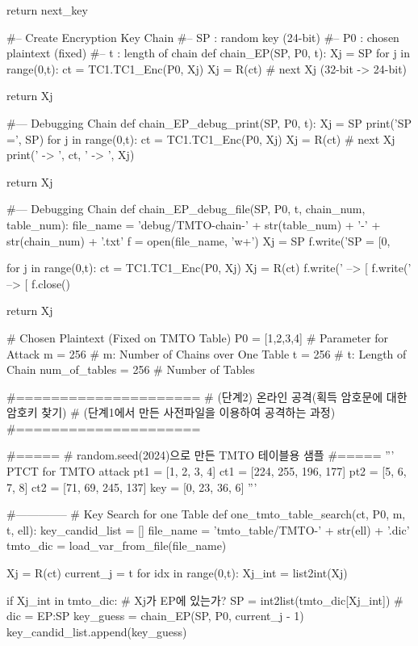 \begin{python}
   return next_key

#-- Create Encryption Key Chain
#-- SP : random key (24-bit)
#-- P0 : chosen plaintext (fixed)
#-- t  : length of chain
def chain_EP(SP, P0, t):
   Xj = SP
   for j in range(0,t):
      ct = TC1.TC1_Enc(P0, Xj)
      Xj = R(ct)   # next Xj (32-bit -> 24-bit)
   
   return Xj

#--- Debugging Chain
def chain_EP_debug_print(SP, P0, t):
   Xj = SP
   print('SP =', SP)
   for j in range(0,t):
      ct = TC1.TC1_Enc(P0, Xj)
      Xj = R(ct)   # next Xj 
      print(' -> ', ct, ' -> ', Xj)
   
   return Xj

#--- Debugging Chain
def chain_EP_debug_file(SP, P0, t, chain_num, table_num):
   file_name = 'debug/TMTO-chain-' + str(table_num) + '-' + str(chain_num) + '.txt'
   f = open(file_name, 'w+')
   Xj = SP
   f.write('SP = [0, %
   
   for j in range(0,t):
      ct = TC1.TC1_Enc(P0, Xj)
      Xj = R(ct)
      f.write(' --> [%
      f.write(' --> [%
   f.close()
   
   return Xj

# Chosen Plaintext (Fixed on TMTO Table)
P0 = [1,2,3,4]
# Parameter for Attack
m = 256             # m: Number of Chains over One Table
t = 256             # t: Length of Chain
num_of_tables = 256 # Number of Tables


#=====================
# (단계2) 온라인 공격(획득 암호문에 대한 암호키 찾기)
# (단계1에서 만든 사전파일을 이용하여 공격하는 과정)
#=====================


#=====
# random.seed(2024)으로 만든 TMTO 테이블용 샘플
#=====
'''
PTCT for TMTO attack
pt1 = [1, 2, 3, 4]
ct1 = [224, 255, 196, 177]
pt2 = [5, 6, 7, 8]
ct2 = [71, 69, 245, 137]
key = [0, 23, 36, 6]
'''

#--------------
# Key Search for one Table
def one_tmto_table_search(ct, P0, m, t, ell):
   key_candid_list = []
   file_name = 'tmto_table/TMTO-' + str(ell) + '.dic'
   tmto_dic = load_var_from_file(file_name)

   Xj = R(ct)
   current_j = t
   for idx in range(0,t):
      Xj_int = list2int(Xj)

      if Xj_int in tmto_dic: # Xj가 EP에 있는가?
         SP = int2list(tmto_dic[Xj_int]) # dic = { EP:SP }
         key_guess = chain_EP(SP, P0, current_j - 1)
         key_candid_list.append(key_guess)


\end{python}
